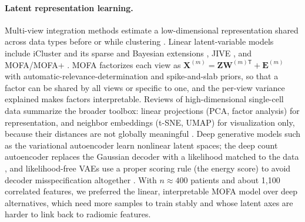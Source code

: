 \paragraph{Latent representation learning.}
Multi-view integration methods estimate a low-dimensional representation
shared across data types before or while clustering
\citep{subramanian2020multiomics,vahabi2022unsupervised,li2026integrative}.
Linear latent-variable models include iCluster and its sparse and Bayesian
extensions \citep{shen2009icluster,mo2013pattern,mo2018bayesian}, JIVE
\citep{lock2013jive,hellton2016integrative}, and MOFA/MOFA+
\citep{argelaguet2018mofa,argelaguet2020mofaplus}. MOFA factorizes each view
as $\mathbf X^{(m)}=\mathbf Z\mathbf W^{(m)\mathsf T}+\mathbf E^{(m)}$ with
automatic-relevance-determination and spike-and-slab priors, so that a factor
can be shared by all views or specific to one, and the per-view variance
explained makes factors interpretable. Reviews of high-dimensional
single-cell data summarize the broader toolbox: linear projections (PCA,
factor analysis) for representation, and neighbor embeddings (t-SNE, UMAP)
for visualization only, because their distances are not globally meaningful
\citep{wu2020tools,zogopoulos2025scrnaseq,vandermaaten2008tsne}. Deep
generative models such as the variational autoencoder
\citep{kingma2014vae} learn nonlinear latent spaces; the deep count
autoencoder replaces the Gaussian decoder with a likelihood matched to the
data \citep{eraslan2019dca}, and likelihood-free VAEs use a proper scoring
rule (the energy score) to avoid decoder misspecification altogether
\citep{xu2025envae}. With $n\approx400$ patients and about 1{,}100 correlated
features, we preferred the linear, interpretable MOFA model over deep
alternatives, which need more samples to train stably and whose latent axes
are harder to link back to radiomic features.

